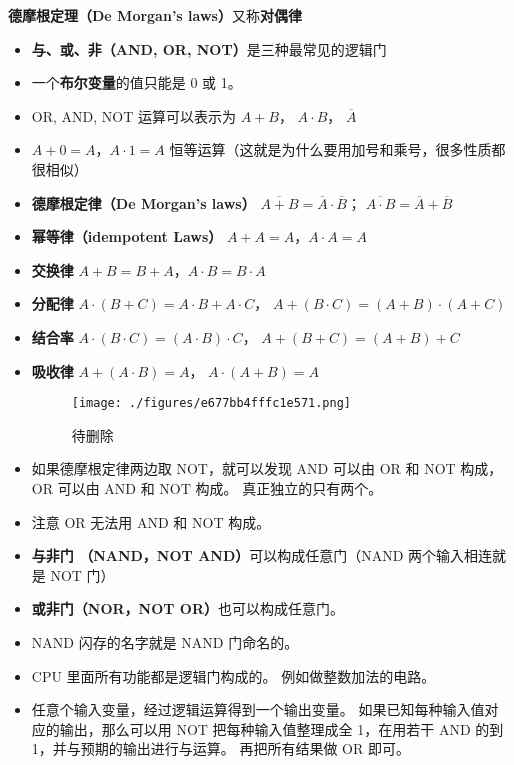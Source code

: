 
\begin{issues}
\issueDraft
\end{issues}

\textbf{德摩根定理（De Morgan's laws）}又称\textbf{对偶律}

\begin{itemize}
\item \textbf{与、或、非（AND, OR, NOT）}是三种最常见的逻辑门
\item 一个\textbf{布尔变量}的值只能是 0 或 1。
\item OR, AND, NOT 运算可以表示为 $A + B$， $A\cdot B$， $\overline A$

\item $A+0=A$，$A\cdot 1=A$ 恒等运算（这就是为什么要用加号和乘号，很多性质都很相似）
\item \textbf{德摩根定律（De Morgan's laws）} $\overline{A+B} = \overline A \cdot \overline B$； $\overline{A \cdot B} = \overline A + \overline B$
\item \textbf{幂等律（idempotent Laws）} $A+A=A$，$A\cdot A=A$
\item \textbf{交换律} $A+B=B+A$，$A\cdot B=B\cdot A$
\item \textbf{分配律} $A\cdot(B+C)=A\cdot B+A\cdot C$， $A+(B\cdot C) = (A+B)\cdot(A+C)$
\item \textbf{结合率} $A\cdot(B\cdot C) = (A\cdot B)\cdot C$， $A+(B+C)=(A+B)+C$
\item \textbf{吸收律} $A+(A\cdot B) = A$， $A\cdot(A+B) = A$
\begin{figure}[ht]
\centering
\texttt{[image: ./figures/e677bb4fffc1e571.png]}
\caption{待删除} \label{fig_LogicG_1}
\end{figure}
\item 如果德摩根定律两边取 NOT，就可以发现 AND 可以由 OR 和 NOT 构成， OR 可以由 AND 和 NOT 构成。 真正独立的只有两个。
\item 注意 OR 无法用 AND 和 NOT 构成。
\item \textbf{与非门 （NAND，NOT AND）}可以构成任意门（NAND 两个输入相连就是 NOT 门）
\item \textbf{或非门（NOR，NOT OR）}也可以构成任意门。 
\item NAND 闪存的名字就是 NAND 门命名的。
\item CPU 里面所有功能都是逻辑门构成的。 例如做整数加法的电路。
\item 任意个输入变量，经过逻辑运算得到一个输出变量。 如果已知每种输入值对应的输出，那么可以用 NOT 把每种输入值整理成全 1，在用若干 AND 的到 1，并与预期的输出进行与运算。 再把所有结果做 OR 即可。
\end{itemize}
